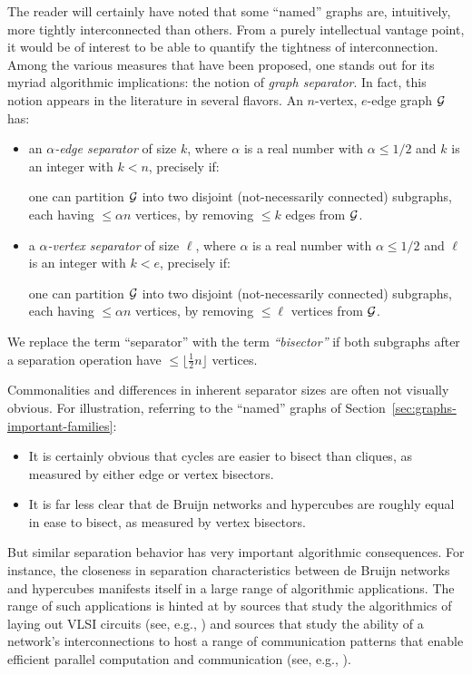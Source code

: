 The reader will certainly have noted that some ``named'' graphs are,
intuitively, more tightly interconnected than others.  From a purely
intellectual vantage point, it would be of interest to be able to
quantify the tightness of interconnection.  Among the various measures
that have been proposed, one stands out for its myriad algorithmic
implications: the notion of {\it graph separator}.  In fact, this
notion appears in the literature in several flavors.  An $n$-vertex,
$e$-edge graph $\mbox{$\cal G$}$ has:
\begin{itemize}
\item
an {\it $\alpha$-edge separator} of size $k$, 
 where $\alpha$ is a
real number with $\alpha \leq 1/2$ and $k$ is an integer with $k < n$,
precisely if:

\smallskip

one can partition $\mbox{$\cal G$}$ into two disjoint (not-necessarily connected)
subgraphs, each having $\leq \alpha n$ vertices, by removing $\leq k$
edges from $\mbox{$\cal G$}$.

\item
a {\it $\alpha$-vertex separator} of size $\ell$,
where $\alpha$ is a real number with $\alpha \leq 1/2$ and $\ell$ is
an integer with $k < e$, precisely if:

\smallskip

one can partition $\mbox{$\cal G$}$ into two disjoint (not-necessarily connected)
subgraphs, each having $\leq \alpha n$ vertices, by removing $\leq \ell$
vertices from $\mbox{$\cal G$}$.
\end{itemize}
We replace the term ``separator'' with the term {\em ``bisector''} 
 
if both subgraphs after a separation operation have $\leq \lfloor
\frac{1}{2} n \rfloor$ vertices.

\medskip

Commonalities and differences in inherent separator sizes are often
not visually obvious.  For illustration, referring to the ``named''
graphs of Section~\ref{sec:graphs-important-families}:
\begin{itemize}
\item
It is certainly obvious that cycles are easier to bisect than cliques,
as measured by either edge or vertex bisectors.
\item
It is far less clear that de Bruijn networks and hypercubes are
roughly equal in ease to bisect, as measured by vertex bisectors.
\end{itemize}
But similar separation behavior has very important algorithmic
consequences.  For instance, the closeness in separation
characteristics between de Bruijn networks and hypercubes manifests
itself in a large range of algorithmic applications.  The range of
such applications is hinted at by sources that study the algorithmics
of laying out VLSI circuits (see, e.g., \cite{Leiserson85}) and
sources that study the ability of a network's interconnections to host
a range of communication patterns that enable efficient parallel
computation and communication (see, e.g.,
\cite{AnnexsteinBR90,Leiserson85,Ullman84}).


